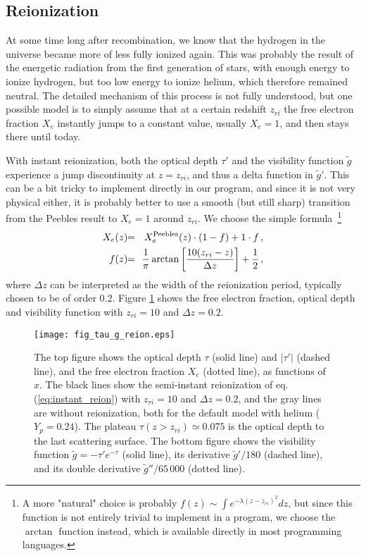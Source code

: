 \documentclass[twocolumn,nofootinbib,amsmath,amssymb]{revtex4}
\newcommand{\ba}{\begin{eqnarray}}
\newcommand{\ea}{\end{eqnarray}}
\newcommand{\hs}{\hspace{-1.12mm}}
\newcommand{\eq}{\hs & = & \hs}
\begin{document}
\subsection{Reionization}
\label{cha:reionization}

At some time long after recombination, we know that the hydrogen in the
universe became more of less fully ionized again. This was probably the result
of the energetic radiation from the first generation of stars, with enough
energy to ionize hydrogen, but too low energy to ionize helium, which therefore
remained neutral. The detailed mechanism of this process is not fully
understood, but one possible model is to simply assume that at a certain
redshift $z_{ri}$ the free electron fraction $X_e$ instantly jumps to a
constant value, usually $X_e = 1$, and then stays there until today.

With instant reionization, both the optical depth $\tau'$ and the visibility
function $\tilde{g}$ experience a jump discontinuity at $z = z_{ri}$, and thus
a delta function in $\tilde{g}'$. This can be a bit tricky to implement
directly in our program, and since it is not very physical either, it is
probably better to use a smooth (but still sharp) transition from the Peebles
result to $X_e = 1$ around $z_{ri}$. We choose the simple formula~\footnote{A
more "natural" choice is probably $f(z) \sim \int e^{-\lambda(z-z_{ri})^2} dz$,
but since this function is not entirely trivial to implement in a program, we
choose the $\arctan$ function instead, which is available directly in most
programming languages.}
\ba
  X_e(z) \eq X^{\mathrm{Peebles}}_e(z) \cdot (1-f) + 1 \cdot f \, ,
    \nonumber \\
  f(z) \eq \frac{1}{\pi}
    \arctan \left[ \frac{10(z_{ri}-z)}{\Delta z} \right] + \frac{1}{2} \, ,
  \label{eq:instant_reion}
\ea
where $\Delta z$ can be interpreted as the width of the reionization period,
typically chosen to be of order $0.2$. Figure \ref{fig:reionization} shows the
free electron fraction, optical depth and visibility function with $z_{ri} =
10$ and $\Delta z = 0.2$.

\begin{figure}[!h]
  \begin{center}
    \texttt{[image: fig\_tau\_g\_reion.eps]}
  \end{center}
  \vspace{-6mm}
  \caption{The top figure shows the optical depth $\tau$ (solid line)
  and $|\tau'|$ (dashed line), and the free electron fraction $X_e$ (dotted
  line), as functions of $x$. The black lines show the semi-instant
  reionization of eq. (\ref{eq:instant_reion}) with $z_{ri} = 10$ and $\Delta z
  = 0.2$, and the gray lines are without reionization, both for the default
  model with helium ($Y_p = 0.24$). The plateau $\tau(z > z_{ri}) \simeq 0.075$
  is the optical depth to the last scattering surface. The bottom figure
  shows the visibility function $\tilde{g} = -\tau' e^{-\tau}$ (solid line),
  its derivative $\tilde{g}'/180$ (dashed line), and its double derivative
  $\tilde{g}''/65\,000$ (dotted line).}
  \label{fig:reionization}
\end{figure}
\end{document}
